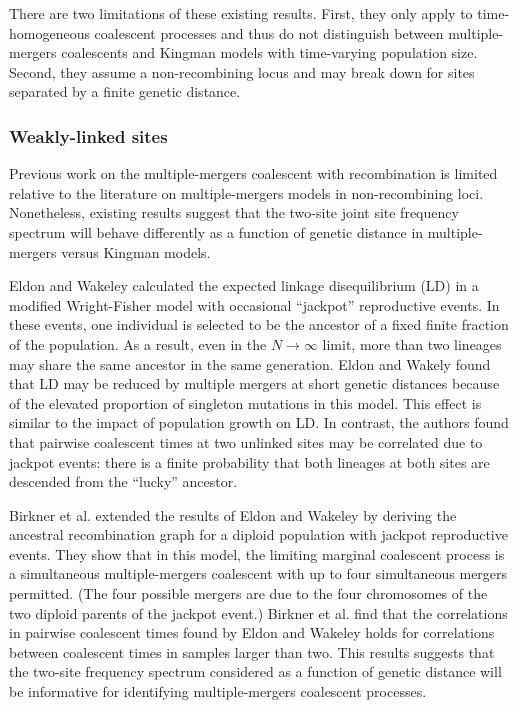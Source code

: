 \documentclass[11pt, letterpaper]{article}   	%
\begin{document}
There are two limitations of these existing results.
First, they only apply to time-homogeneous coalescent processes and thus do not distinguish between multiple-mergers coalescents and Kingman models with time-varying population size.
Second, they assume a non-recombining locus and may break down for sites separated by a finite genetic distance.

\subsubsection*{Weakly-linked sites}

Previous work on the multiple-mergers coalescent with recombination is limited relative to the literature on multiple-mergers models in non-recombining loci.
Nonetheless, existing results suggest that the two-site joint site frequency spectrum will behave differently as a function of genetic distance in multiple-mergers versus Kingman models.

Eldon and Wakeley \cite{} calculated the expected linkage disequilibrium (LD) in a modified Wright-Fisher model with occasional ``jackpot'' reproductive events.
In these events, one individual is selected to be the ancestor of a fixed finite fraction of the population.
As a result, even in the $N \to \infty$ limit, more than two lineages may share the same ancestor in the same generation.
Eldon and Wakely found that LD may be reduced by multiple mergers at short genetic distances because of the elevated proportion of singleton mutations in this model.
This effect is similar to the impact of population growth on LD.
In contrast, the authors found that pairwise coalescent times at two unlinked sites may be correlated due to jackpot events: there is a finite probability that both lineages at both sites are descended from the ``lucky'' ancestor.

Birkner et al. \cite{} extended the results of Eldon and Wakeley \cite{} by deriving the ancestral recombination graph for a diploid population with jackpot reproductive events.
They show that in this model, the limiting marginal coalescent process is a simultaneous multiple-mergers coalescent with up to four simultaneous mergers permitted.
(The four possible mergers are due to the four chromosomes of the two diploid parents of the jackpot event.)
Birkner et al. find that the correlations in pairwise coalescent times found by Eldon and Wakeley holds for correlations between coalescent times in samples larger than two.
This results suggests that the two-site frequency spectrum considered as a function of genetic distance will be informative for identifying multiple-mergers coalescent processes. 
\end{document}
